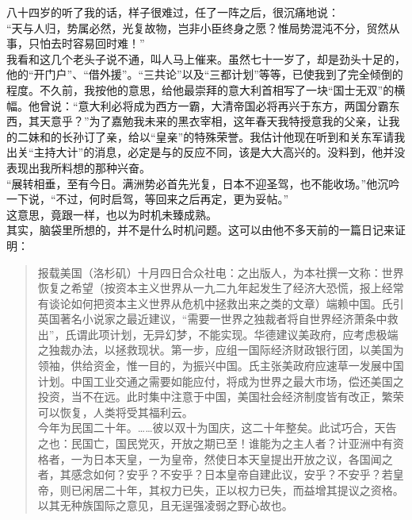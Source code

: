 八十四岁的听了我的话，样子很难过，任了一阵之后，很沉痛地说：\\

“天与人归，势属必然，光复故物，岂非小臣终身之愿？惟局势混沌不分，贸然从事，只怕去时容易回时难！”\\

我看和这几个老头子说不通，叫人马上催来。虽然七十一岁了，却是劲头十足的，他的“开门户”、“借外援”。“三共论”以及“三都计划”等等，已使我到了完全倾倒的程度。不久前，我按他的意思，给他最崇拜的意大利首相写了一块“国士无双”的横幅。他曾说：“意大利必将成为西方一霸，大清帝国必将再兴于东方，两国分霸东西，其天意乎？”为了嘉勉我未来的黑衣宰相，这年春天我特授意我的父亲，让我的二妹和的长孙订了亲，给以“皇亲”的特殊荣誉。我估计他现在听到和关东军请我出关“主持大计”的消息，必定是与的反应不同，该是大大高兴的。没料到，他并没表现出我所料想的那种兴奋。\\

“展转相垂，至有今日。满洲势必首先光复，日本不迎圣驾，也不能收场。”他沉吟一下说，“不过，何时启驾，等回来之后再定，更为妥帖。”\\

这意思，竟跟一样，也以为时机未臻成熟。\\

其实，脑袋里所想的，并不是什么时机问题。这可以由他不多天前的一篇日记来证明：\\

\begin{quote}
	报载美国（洛杉矶）十月四日合众社电：之出版人，为本社撰一文称：世界恢复之希望（按资本主义世界从一九二九年起发生了经济大恐慌，报上经常有谈论如何把资本主义世界从危机中拯救出来之类的文章）端赖中国。氏引英国著名小说家之最近建议，“需要一世界之独裁者将自世界经济萧条中救出”，氏谓此项计划，无异幻梦，不能实现。华德建议美政府，应考虑极端之独裁办法，以拯救现状。第一步，应组一国际经济财政银行团，以美国为领袖，供给资金，惟一目的，为振兴中国。氏主张美政府应速草一发展中国计划。中国工业交通之需要如能应付，将成为世界之最大市场，偿还美国之投资，当不在远。此时集中注意于中国，美国社会经济制度皆有改正，繁荣可以恢复，人类将受其福利云。\\

今年为民国二十年。……彼以双十为国庆，这二十年整矣。此试巧合，天告之也：民国亡，国民党灭，开放之期已至！谁能为之主人者？计亚洲中有资格者，一为日本天皇，一为皇帝，然使日本天皇提出开放之议，各国闻之者，其感念如何？安乎？不安乎？日本皇帝自建此议，安乎？不安乎？若皇帝，则已闲居二十年，其权力已失，正以权力已失，而益增其提议之资格。以其无种族国际之意见，且无逞强凌弱之野心故也。\\
\end{quote}

